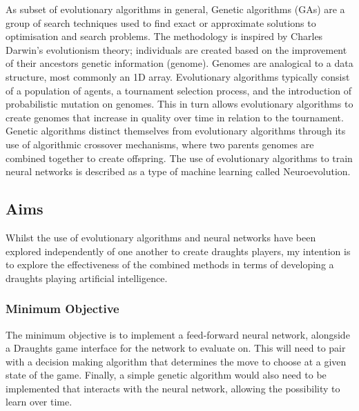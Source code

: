 \documentclass[12pt,a4paper]{article}
\begin{document}
    As subset of evolutionary algorithms in general, Genetic algorithms (GAs) are a group of search techniques used to find exact or approximate solutions to optimisation and search problems. The methodology is inspired by Charles Darwin's evolutionism theory; individuals are created based on the improvement of their ancestors genetic information (genome). Genomes are analogical to a data structure, most commonly an 1D array. Evolutionary algorithms typically consist of a population of agents, a tournament selection process, and the introduction of probabilistic mutation on genomes. This in turn allows evolutionary algorithms to create genomes that increase in quality over time in relation to the tournament. Genetic algorithms distinct themselves from evolutionary algorithms through its use of algorithmic crossover mechanisms, where two parents genomes are combined together to create offspring. The use of evolutionary algorithms to train neural networks is described as a type of machine learning called Neuroevolution.

    \subsection{Aims}

    Whilst the use of evolutionary algorithms and neural networks have been explored independently of one another to create draughts players, my intention is to explore the effectiveness of the combined methods in terms of developing a  draughts playing artificial intelligence. 

    \subsubsection{Minimum Objective}
        The minimum objective is to implement a feed-forward neural network, alongside a Draughts game interface for the network to evaluate on. This will need to pair with a decision making algorithm that determines the move to choose at a given state of the game. Finally, a simple genetic algorithm would also need to be implemented that interacts with the neural network, allowing the possibility to learn over time.
\end{document}
